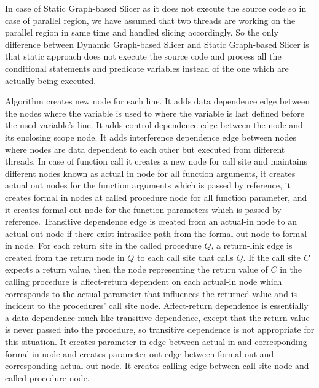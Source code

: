 \documentclass[conference]{IEEEtran}
\begin{document}
\par In case of Static Graph-based Slicer as it does not execute the source code so in case of parallel region, we have assumed that two threads are working on the parallel region in same time and handled slicing accordingly. So the only difference between Dynamic Graph-based Slicer and Static Graph-based Slicer is that static approach does not execute the source code and process all the conditional statements and predicate variables instead of the one which are actually being executed.
\par  Algorithm creates new node for each line. It adds data dependence edge between the nodes where the variable is used to where the variable is last defined before the used variable’s line. It adds control dependence edge between the node and its enclosing scope node. It adds interference dependence edge between nodes where nodes are data dependent to each other but executed from different threads. In case of function call it creates a new node for call site and maintains different nodes known as actual in node for all function arguments, it creates actual out nodes for the function arguments which is passed by reference, it creates formal in nodes at called procedure node for all function parameter, and it creates formal out node for the function parameters which is passed by reference. Transitive dependence edge is created from an actual-in node to an actual-out node if there exist intraslice-path from the formal-out node to formal-in node. For each return site in the called procedure $Q$, a return-link edge is created from the return node in $Q$ to each call site that calls $Q$. If the call site $C$ expects a return value, then the node representing the return value of $C$ in the calling procedure is affect-return dependent on each actual-in node which corresponds to the actual parameter that influences the returned value and is incident to the procedures' call site node. Affect-return dependence is essentially a data dependence much like transitive dependence, except that the return value is never passed into the procedure, so transitive dependence is not appropriate for this situation. It creates parameter-in edge between actual-in and corresponding formal-in node and creates parameter-out edge between formal-out and corresponding actual-out node. It creates calling edge between call site node and called procedure node.
\end{document}
